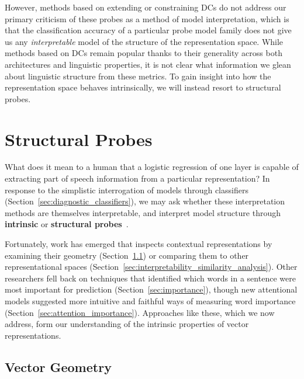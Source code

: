 However, methods based on extending or constraining DCs do not address our primary criticism of these probes as a method of model interpretation, which is that the classification accuracy of a particular probe model family does not give us any \textit{interpretable} model of the structure of the representation space. While methods based on DCs remain popular thanks to their generality across both architectures and linguistic properties, it is not clear what information we glean about linguistic structure from these metrics. To gain insight into how the representation space behaves intrinsically, we will instead resort to structural probes.


\section{Structural Probes} \label{sec:structural_probes}

What does it mean to a human that a logistic regression of one layer is capable of extracting part of speech information from a particular representation?
In response to the simplistic interrogation of models through classifiers (Section~\ref{sec:diagnostic_classifiers}), we may ask whether these interpretation methods are themselves interpretable, and interpret model structure through \textbf{intrinsic} or \textbf{structural probes}~\citep{hennigen_intrinsic_2020}.

Fortunately, work has emerged that inspects contextual representations by examining their geometry (Section~\ref{sec:geometry}) or comparing them to other representational spaces (Section~\ref{sec:interpretability_similarity_analysis}). Other researchers fell back on techniques that identified which words in a sentence were most important for prediction (Section~\ref{sec:importance}), though new attentional models suggested more intuitive and faithful ways of measuring word importance (Section~\ref{sec:attention_importance}). Approaches like these, which we now address, form our understanding of the intrinsic properties of vector representations.


\subsection{Vector Geometry} \label{sec:geometry}

